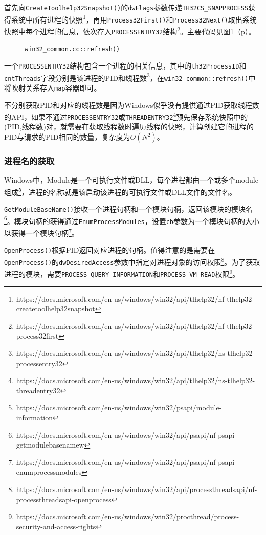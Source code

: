 \documentclass[UTF8,twoside,titlepage]{ctexart}
\newcommand\code[1]{\texttt{#1}}
\newcommand\myref[1]{\ref{#1}（p\pageref{#1}）}
\begin{document}
首先向\code{CreateToolhelp32Snapshot()}的\code{dwFlags}参数传递\code{TH32CS\_SNAPPROCESS}获得系统中所有进程的快照\footnote{https://docs.microsoft.com/en-us/windows/win32/api/tlhelp32/nf-tlhelp32-createtoolhelp32snapshot}，再用\code{Process32First()}和\code{Process32Next()}取出系统快照中每个进程的信息，依次存入\code{PROCESSENTRY32}结构\footnote{https://docs.microsoft.com/en-us/windows/win32/api/tlhelp32/nf-tlhelp32-process32first}。主要代码见图\myref{code:pidthrd}。

\begin{figure}[H]
    \ttfamily
    
    \caption{\code{win32\_common.cc::refresh()}}
    \label{code:pidthrd}
\end{figure}

一个\code{PROCESSENTRY32}结构包含一个进程的相关信息，其中的\code{th32ProcessID}和\code{cntThreads}字段分别是该进程的PID和线程数\footnote{https://docs.microsoft.com/en-us/windows/win32/api/tlhelp32/ns-tlhelp32-processentry32}，在\code{win32\_common::refresh()}中将映射关系存入\code{map}容器即可。

不分别获取PID和对应的线程数是因为Windows似乎没有提供通过PID获取线程数的API，如果不通过\code{PROCESSENTRY32}或\code{THREADENTRY32}\footnote{https://docs.microsoft.com/en-us/windows/win32/api/tlhelp32/ns-tlhelp32-threadentry32}预先保存系统快照中的(PID,线程数)对，就需要在获取线程数时遍历线程的快照，计算创建它的进程的PID与请求的PID相同的数量，复杂度为$O(N^2)$。

\subsubsection{进程名的获取}
Windows中，Module是一个可执行文件或DLL，每个进程都由一个或多个module组成\footnote{https://docs.microsoft.com/en-us/windows/win32/psapi/module-information}，进程的名称就是该启动该进程的可执行文件或DLL文件的文件名。



\code{GetModuleBaseName()}接收一个进程句柄和一个模块句柄，返回该模块的模块名\footnote{https://docs.microsoft.com/en-us/windows/win32/api/psapi/nf-psapi-getmodulebasenamew}。模块句柄的获得通过\code{EnumProcessModules}，设置\code{cb}参数为一个模块句柄的大小以获得一个模块句柄\footnote{https://docs.microsoft.com/en-us/windows/win32/api/psapi/nf-psapi-enumprocessmodules}。

\code{OpenProcess()}根据PID返回对应进程的句柄。值得注意的是需要在\code{OpenProcess()}的\code{dwDesiredAccess}参数中指定对进程对象的访问权限\footnote{https://docs.microsoft.com/en-us/windows/win32/api/processthreadsapi/nf-processthreadsapi-openprocess}。为了获取进程的模块，需要\code{PROCESS\_QUERY\_INFORMATION}和\code{PROCESS\_VM\_READ}权限\footnote{https://docs.microsoft.com/en-us/windows/win32/procthread/process-security-and-access-rights}。
\end{document}
